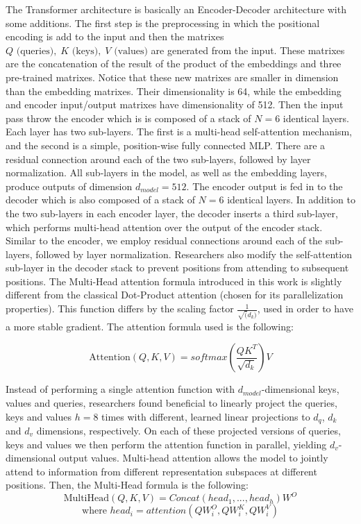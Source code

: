 \documentclass[11pt]{article}
\begin{document}
The Transformer architecture is basically an Encoder-Decoder architecture with some additions. The first step is the preprocessing in which the positional encoding is add to the input and then the matrixes $Q \textrm{ (queries)}, \; K \textrm{ (keys)}, \; V \textrm{ (values)}$ are generated from the input. These matrixes are the concatenation of the result of the product of the embeddings and three pre-trained matrixes. Notice that these new matrixes are smaller in dimension than the embedding matrixes. Their dimensionality is 64, while the embedding and encoder input/output matrixes have dimensionality of 512. Then the input pass throw the encoder which is is composed of a stack of $N = 6$ identical layers. Each layer has two sub-layers. The first is a multi-head self-attention mechanism, and the second is a simple, position-wise fully connected MLP. There are a residual connection around each of the two sub-layers, followed by layer normalization. All sub-layers in the model, as well as the embedding layers, produce outputs of dimension $d_{model} = 512$. The encoder output is fed in to the decoder which is also composed of a stack of $N = 6$ identical layers. In addition to the two sub-layers in each encoder layer, the decoder inserts a third sub-layer, which performs multi-head attention over the output of the encoder stack. Similar to the encoder, we employ residual connections around each of the sub-layers, followed by layer normalization. Researchers also modify the self-attention sub-layer in the decoder stack to prevent positions from attending to subsequent positions. \newpage
\noindent The Multi-Head attention formula introduced in this work is slightly different from the classical Dot-Product attention (chosen for its parallelization properties). This function differs by the scaling factor $\frac{1}{\sqrt(d_k)}$, used in order to have a more stable gradient. The attention formula used is the following: 

\begin{displaymath}
\textrm{Attention}(Q,K,V) = softmax(\frac{QK^T}{\sqrt{d_k}})V
\end{displaymath}

\noindent Instead of performing a single attention function with $d_{model}$-dimensional keys, values and queries, researchers found beneficial to linearly project the queries, keys and values $h=8$ times with different, learned linear projections to $d_q$, $d_k$ and $d_v$ dimensions, respectively. On each of these projected versions of queries, keys and values we then perform the attention function in parallel, yielding $d_v$-dimensional output values. Multi-head attention allows the model to jointly attend to information from different representation subspaces at different positions. Then, the Multi-Head formula is the following:
\begin{displaymath}
\textrm{MultiHead}(Q, K, V) = Concat(head_1, ..., head_h)W^O
\end{displaymath}
\begin{displaymath}
\textrm{where } head_i = attention(QW^O_i, QW^K_i, QW^V_i)
\end{displaymath}
\end{document}
